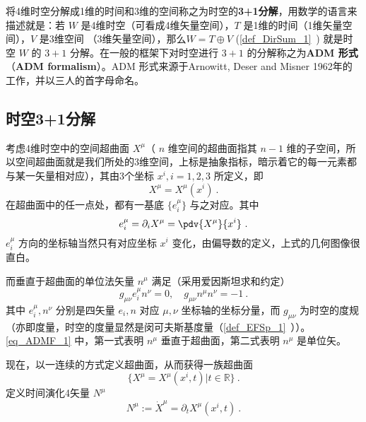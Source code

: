 
\begin{issues}
\end{issues}


将4维时空分解成1维的时间和3维的空间称之为时空的\textbf{3+1分解}，用数学的语言来描述就是：若 $W$ 是4维时空（可看成4维矢量空间），$T$ 是1维的时间（1维矢量空间），$V$ 是3维空间 （3维矢量空间），那么$W=T\oplus V$ (\autoref{def_DirSum_1}~) 就是时空 $W$ 的 $3+1$ 分解。在一般的框架下对时空进行 $3+1$ 的分解称之为\textbf{ADM 形式}（\textbf{ADM formalism}）。ADM 形式来源于Arnowitt, Deser and Misner 1962年的工作，并以三人的首字母命名。
\subsection{时空3+1分解}
考虑4维时空中的空间超曲面 $X^\mu$（ $n$ 维空间的超曲面指其 $n-1$ 维的子空间，所以空间超曲面就是我们所处的3维空间，上标是抽象指标，暗示着它的每一元素都与某一矢量相对应），其由3个坐标 $x^i,i=1,2,3$ 所定义，即 
\begin{equation}
X^\mu=X^\mu(x^i)~.
\end{equation}
在超曲面中的任一点处，都有一基底 $\{e^\mu_i\}$ 与之对应。其中
\begin{equation}
e^\mu_i=\partial_i  X^\mu=\pdv{ X^\mu}{x^i}~.
\end{equation}
$e^\mu_i$ 方向的坐标轴当然只有对应坐标 $x^i$ 变化，由偏导数的定义，上式的几何图像很直白。

而垂直于超曲面的单位法矢量 $n^\mu$ 满足（采用爱因斯坦求和约定）
\begin{equation}\label{eq_ADMF_1}
g_{\mu\nu} e_i^\mu n^\nu=0,\quad g_{\mu\nu}n^\mu n^\nu=-1~.
\end{equation}
其中 $e_i^\mu,n^\nu$ 分别是四矢量 $ e_i,n$ 对应 $\mu,\nu$ 坐标轴的坐标分量，而 $g_{\mu\nu}$ 为时空的度规（亦即度量，时空的度量显然是闵可夫斯基度量（\autoref{def_EFSp_1}~））。\autoref{eq_ADMF_1} 中，第一式表明 $n^\mu$ 垂直于超曲面，第二式表明 $n^\mu$ 是单位矢。

现在，以一连续的方式定义超曲面，从而获得一族超曲面 
\begin{equation}
\{{X^\mu}= X^\mu(x^i,t)|t\in\mathbb R\}~.
\end{equation}
定义时间演化4矢量 $N^\mu$
\begin{equation}
N^\mu:=\dot{X}^\mu=\partial_t  X^\mu(x^i,t)~.
\end{equation}

